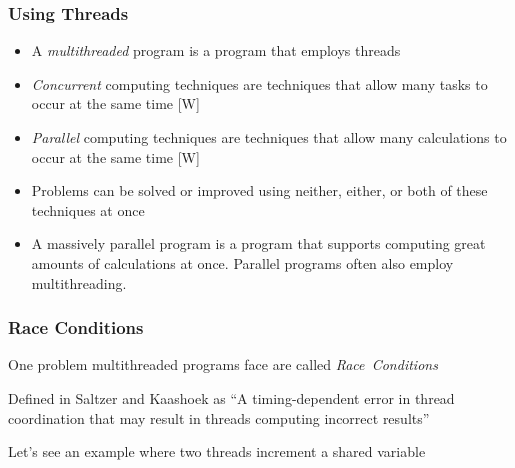 \documentclass{beamer}
\newcommand{\linespace}{\vskip 0.25cm}
\begin{document}
\begin{frame}
\frametitle{Using Threads}

	\begin{itemize}
  		\item A \emph{multithreaded} program is a program that employs threads
  		
  		\linespace
  		
  		\item \emph{Concurrent} computing techniques are techniques that allow many tasks to occur at the same time [W]
  		
  		\linespace  		
  		
  		\item \emph{Parallel} computing techniques are techniques that allow many calculations to occur at the same time [W]
  		
\linespace  		
  		
		\item Problems can be solved or improved using neither, either, or both of these techniques at once
		
  		\linespace
  		
  		\item A massively parallel program is a program that supports computing great amounts of calculations at once. Parallel programs often also employ multithreading.
  		
	  \end{itemize}

\end{frame}


\begin{frame}
\frametitle{Race Conditions}

One problem multithreaded programs face are called \emph{Race~Conditions}

\linespace

Defined in Saltzer and Kaashoek as ``A timing-dependent error in thread coordination that may result in threads computing incorrect results'' 

\linespace

Let's see an example where two threads increment a shared variable
\end{frame}
\end{document}
